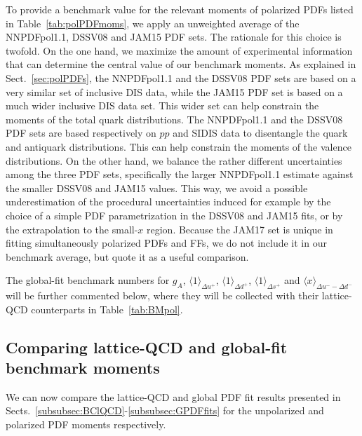 To provide a benchmark value for the relevant moments of 
polarized PDFs listed in Table~\ref{tab:polPDFmoms}, we apply an unweighted 
average of the NNPDFpol1.1, DSSV08 and JAM15 PDF sets.
%
The rationale for this choice is twofold.
%
On the one hand, we maximize the amount of experimental information 
that can determine the central value of our benchmark moments.
%
As explained in Sect.~\ref{sec:polPDFs}, the NNPDFpol1.1 and the DSSV08 PDF 
sets are based on a very similar set of inclusive DIS data, while the JAM15 
PDF set is based on a much wider inclusive DIS data set.
%
This wider set can help constrain the moments of the total quark 
distributions.
%
The NNPDFpol1.1 and the DSSV08 PDF sets are based respectively on $pp$ and 
SIDIS data to disentangle the quark and antiquark distributions.
%
This can help constrain the moments of the valence distributions.
%
On the other hand, we balance the rather different uncertainties among the 
three PDF sets, specifically the larger NNPDFpol1.1 estimate
against the smaller DSSV08 and JAM15 values.
%
This way, we avoid a possible underestimation of the procedural uncertainties 
induced for example by the choice of a simple PDF parametrization 
in the DSSV08 and JAM15 fits, or by the extrapolation to the small-$x$ region.
%
Because the JAM17 set is unique in fitting simultaneously polarized PDFs and 
FFs, we do not include it in our benchmark average, but quote it as a useful 
comparison.

The global-fit benchmark numbers for $g_A$,
$\langle 1 \rangle_{\Delta u^+}$, $\langle 1 \rangle_{\Delta d^+}$,
$\langle 1 \rangle_{\Delta s^+}$ and $\langle x \rangle_{\Delta u^- - \Delta d^-}$
will be further commented below, where they will be collected
with their lattice-QCD counterparts in Table~\ref{tab:BMpol}.

\subsection{Comparing lattice-QCD and global-fit benchmark moments}
\label{subsec:BN}

We can now compare the lattice-QCD and global PDF fit results presented in 
Sects.~\ref{subsubsec:BClQCD}-\ref{subsubsec:GPDFfits} for the unpolarized
and polarized PDF moments respectively.

